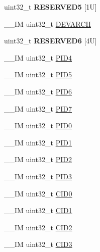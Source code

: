 \begin{DoxyCompactItemize}
\item 
\mbox{\label{struct_i_t_m___type_a171526446695fcdbfaf7992e567f881d}} 
uint32\+\_\+t {\bfseries R\+E\+S\+E\+R\+V\+E\+D5} \mbox{[}1\+U\mbox{]}
\item 
\+\_\+\+\_\+\+IM uint32\+\_\+t \mbox{\hyperlink{struct_i_t_m___type_ae370aa5dc47fe03310e1d847333030e7}{D\+E\+V\+A\+R\+CH}}
\item 
\mbox{\label{struct_i_t_m___type_a8841a7f9533f78764cfcbf4cda67dfc7}} 
uint32\+\_\+t {\bfseries R\+E\+S\+E\+R\+V\+E\+D6} \mbox{[}4\+U\mbox{]}
\item 
\+\_\+\+\_\+\+IM uint32\+\_\+t \mbox{\hyperlink{struct_i_t_m___type_a4c002e97cda2375d7421ad6415b6a02f}{P\+I\+D4}}
\item 
\+\_\+\+\_\+\+IM uint32\+\_\+t \mbox{\hyperlink{struct_i_t_m___type_ac085b26f43fefeef9a4cf5c2af5e4a38}{P\+I\+D5}}
\item 
\+\_\+\+\_\+\+IM uint32\+\_\+t \mbox{\hyperlink{struct_i_t_m___type_a83ac5d00dee24cc7f805b5c147625593}{P\+I\+D6}}
\item 
\+\_\+\+\_\+\+IM uint32\+\_\+t \mbox{\hyperlink{struct_i_t_m___type_af8aa73aeaf37bdf7dfd9f6c437ff2d2f}{P\+I\+D7}}
\item 
\+\_\+\+\_\+\+IM uint32\+\_\+t \mbox{\hyperlink{struct_i_t_m___type_a6e3343cc3c4a8a5a6f14937882e9202a}{P\+I\+D0}}
\item 
\+\_\+\+\_\+\+IM uint32\+\_\+t \mbox{\hyperlink{struct_i_t_m___type_afa06959344f4991b00e6c545dd2fa30b}{P\+I\+D1}}
\item 
\+\_\+\+\_\+\+IM uint32\+\_\+t \mbox{\hyperlink{struct_i_t_m___type_a63db39f871596d28e69c283288ea2eba}{P\+I\+D2}}
\item 
\+\_\+\+\_\+\+IM uint32\+\_\+t \mbox{\hyperlink{struct_i_t_m___type_ac2d006eed52ba550a309e5f61ed9c401}{P\+I\+D3}}
\item 
\+\_\+\+\_\+\+IM uint32\+\_\+t \mbox{\hyperlink{struct_i_t_m___type_a26bbad5d9e0f1d302611d52373aef839}{C\+I\+D0}}
\item 
\+\_\+\+\_\+\+IM uint32\+\_\+t \mbox{\hyperlink{struct_i_t_m___type_a4e60a608afd6433ecd943d95e417b80b}{C\+I\+D1}}
\item 
\+\_\+\+\_\+\+IM uint32\+\_\+t \mbox{\hyperlink{struct_i_t_m___type_ad98950702e55d1851e91b22de07b11aa}{C\+I\+D2}}
\item 
\+\_\+\+\_\+\+IM uint32\+\_\+t \mbox{\hyperlink{struct_i_t_m___type_ab9af64f413bf6f67e2a8044481292f67}{C\+I\+D3}}

\end{DoxyCompactItemize}
